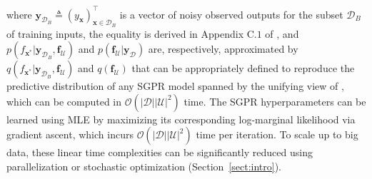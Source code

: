 \documentclass[conference]{IEEEtran}
\begin{document}
	where $\mathbf{y}_{\mathcal{D}_B} \triangleq (y_{\mathbf{x}})^\top_{\mathbf{x}\in\mathcal{D}_B}$ is a vector of noisy observed outputs for the subset $\mathcal{D}_B$ of training inputs, the equality is derived in Appendix C.$1$ of \cite{NghiaICML15}, and
	$p(f_{\mathbf{x}^*}|\mathbf{y}_{\mathcal{D}_B},\mathbf{f}_\mathcal{U})$ and $p(\mathbf{f}_\mathcal{U}|\mathbf{y}_\mathcal{D})$ are, respectively, approximated by $q(f_{\mathbf{x}^*}|\mathbf{y}_{\mathcal{D}_B},\mathbf{f}_\mathcal{U})$ and $q(\mathbf{f}_\mathcal{U})$ 
that can be appropriately defined to reproduce the predictive distribution of any SGPR model \cite{NghiaICML15} spanned by the unifying view of \cite{candela05}, which can be computed in $\mathcal{O}(|\mathcal{D}||\mathcal{U}|^2)$ time.   
	The SGPR hyperparameters can be learned using MLE by maximizing its corresponding log-marginal likelihood via gradient ascent, which incurs $\mathcal{O}(|\mathcal{D}||\mathcal{U}|^2)$ time per iteration.
	To scale up to big data, these linear time complexities can be significantly reduced  using parallelization or stochastic optimization (Section~\ref{sect:intro}).%
\end{document}
